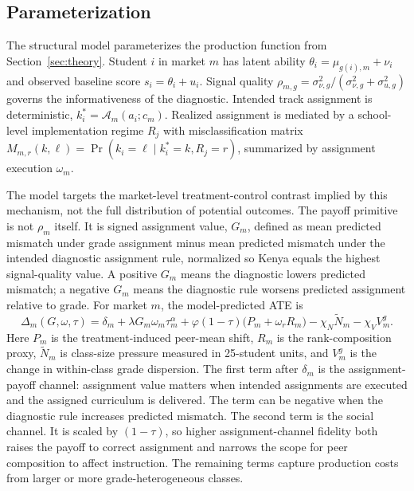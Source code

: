 \documentclass[11pt]{article}
\begin{document}
\subsection{Parameterization}
\label{subsec:struct_param}

The structural model parameterizes the production function from Section~\ref{sec:theory}. Student $i$ in market $m$ has latent ability $\theta_i = \mu_{g(i),m} + \nu_i$ and observed baseline score $s_i = \theta_i + u_i$. Signal quality $\rho_{m,g} = \sigma^2_{\nu,g}/(\sigma^2_{\nu,g} + \sigma^2_{u,g})$ governs the informativeness of the diagnostic. Intended track assignment is deterministic, $k_i^* = \mathcal{A}_m(a_i; c_m)$. Realized assignment is mediated by a school-level implementation regime $R_j$ with misclassification matrix $M_{m,r}(k,\ell) = \Pr(k_i = \ell \mid k_i^* = k, R_j = r)$, summarized by assignment execution $\omega_m$.

The model targets the market-level treatment-control contrast implied by this mechanism, not the full distribution of potential outcomes. The payoff primitive is not $\rho_m$ itself. It is signed assignment value, $G_m$, defined as mean predicted mismatch under grade assignment minus mean predicted mismatch under the intended diagnostic assignment rule, normalized so Kenya equals the highest signal-quality value. A positive $G_m$ means the diagnostic lowers predicted mismatch; a negative $G_m$ means the diagnostic rule worsens predicted assignment relative to grade. For market $m$, the model-predicted ATE is
\begin{equation}
\label{eq:str_ate_map}
\Delta_m(G,\omega,\tau)
= \delta_m
+ \lambda G_m\omega_m\tau_m^\alpha
+ \varphi(1-\tau)\big(P_m+\omega_r R_m\big)
- \chi_N \widetilde{N}_m
- \chi_V V^g_m .
\end{equation}
Here $P_m$ is the treatment-induced peer-mean shift, $R_m$ is the rank-composition proxy, $\widetilde{N}_m$ is class-size pressure measured in 25-student units, and $V^g_m$ is the change in within-class grade dispersion. The first term after $\delta_m$ is the assignment-payoff channel: assignment value matters when intended assignments are executed and the assigned curriculum is delivered. The term can be negative when the diagnostic rule increases predicted mismatch. The second term is the social channel. It is scaled by $(1-\tau)$, so higher assignment-channel fidelity both raises the payoff to correct assignment and narrows the scope for peer composition to affect instruction. The remaining terms capture production costs from larger or more grade-heterogeneous classes.
\end{document}
